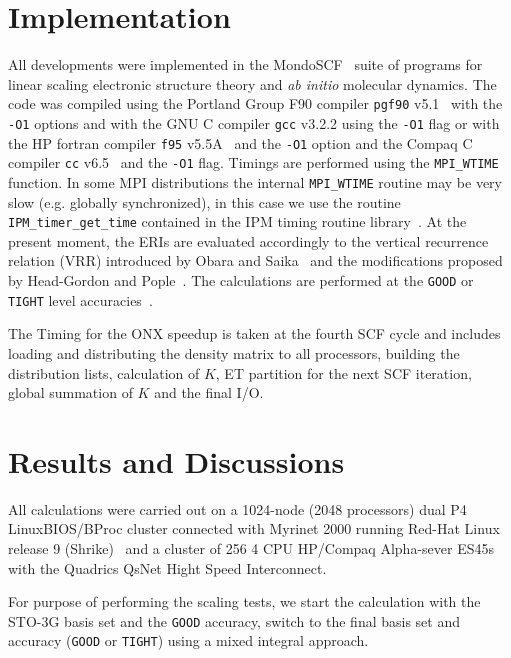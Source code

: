 \documentclass[prl,twocolumn,twocolumngrid,superbib]{revtex4}
\begin{document}
\section{Implementation}\label{Sec:Impl}
 
 All developments were implemented in the MondoSCF~\cite{MondoSCF} suite of
 programs for linear scaling electronic structure theory and 
 {\it ab initio} molecular dynamics. 
 The code was compiled using the Portland Group F90 
 compiler {\tt pgf90} v5.1~\cite{pgf90-v5.1} with the {\tt -O1} options 
 and with the GNU C compiler {\tt gcc} v3.2.2 using the {\tt -O1} flag
 or with the HP fortran compiler {\tt f95} v5.5A~\cite{f95-v5.5a} 
 and the {\tt -O1} option and the Compaq C compiler {\tt cc} 
 v6.5~\cite{cc-v6.5} and the {\tt -O1} flag.
 Timings are performed using the {\tt MPI\_WTIME} function. 
 In some MPI distributions the internal {\tt MPI\_WTIME} 
 routine may be very slow (e.g. globally synchronized), 
 in this case we use the routine {\tt IPM\_timer\_get\_time} contained in 
 the IPM timing routine library~\cite{IPM}.
 At the present moment, the ERIs are evaluated accordingly to
 the vertical recurrence relation (VRR) introduced by Obara 
 and Saika~\cite{SObara86} and the modifications proposed by Head-Gordon
 and Pople~\cite{MGordon88}.
 The calculations are performed at the {\tt GOOD} or {\tt TIGHT} 
 level accuracies~\cite{CTymczak04b}.

 The Timing for the ONX speedup is taken at the fourth SCF cycle
 and includes loading and distributing the density matrix to all 
 processors, building the distribution lists, calculation of $K$,
 ET partition for the next SCF iteration, global summation of $K$
 and the final I/O.


\section{Results and Discussions}\label{Sec:Disc}

 All calculations were carried out on a 1024-node (2048 processors) 
 dual P4 LinuxBIOS/BProc cluster connected with Myrinet 2000 running
 Red-Hat Linux release 9 (Shrike)~\cite{RedHat90} and a cluster of 256 
 4 CPU HP/Compaq Alpha-sever ES45s with the Quadrics QsNet Hight Speed Interconnect. 

 For purpose of performing the scaling tests, we start the calculation 
 with the STO-3G basis set and the {\tt GOOD} accuracy, switch to
 the final basis set and accuracy ({\tt GOOD} or {\tt TIGHT}) using a mixed 
 integral approach. 
\end{document}
